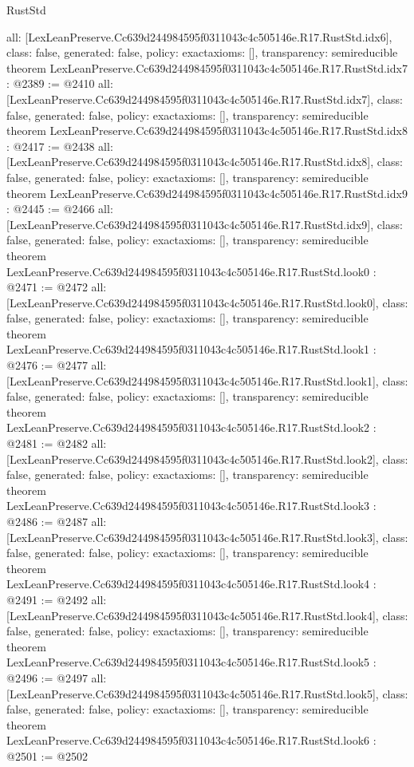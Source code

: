 \begin{lexlean}{RustStd}
\begin{coremodule}
{  all: [LexLeanPreserve.Cc639d244984595f0311043c4c505146e.R17.RustStd.idx6],
  class: false,
  generated: false,
  policy: exact{axioms: []},
  transparency: semireducible
}
theorem LexLeanPreserve.Cc639d244984595f0311043c4c505146e.R17.RustStd.idx7 : @2389 := @2410 {
  all: [LexLeanPreserve.Cc639d244984595f0311043c4c505146e.R17.RustStd.idx7],
  class: false,
  generated: false,
  policy: exact{axioms: []},
  transparency: semireducible
}
theorem LexLeanPreserve.Cc639d244984595f0311043c4c505146e.R17.RustStd.idx8 : @2417 := @2438 {
  all: [LexLeanPreserve.Cc639d244984595f0311043c4c505146e.R17.RustStd.idx8],
  class: false,
  generated: false,
  policy: exact{axioms: []},
  transparency: semireducible
}
theorem LexLeanPreserve.Cc639d244984595f0311043c4c505146e.R17.RustStd.idx9 : @2445 := @2466 {
  all: [LexLeanPreserve.Cc639d244984595f0311043c4c505146e.R17.RustStd.idx9],
  class: false,
  generated: false,
  policy: exact{axioms: []},
  transparency: semireducible
}
theorem LexLeanPreserve.Cc639d244984595f0311043c4c505146e.R17.RustStd.look0 : @2471 := @2472 {
  all: [LexLeanPreserve.Cc639d244984595f0311043c4c505146e.R17.RustStd.look0],
  class: false,
  generated: false,
  policy: exact{axioms: []},
  transparency: semireducible
}
theorem LexLeanPreserve.Cc639d244984595f0311043c4c505146e.R17.RustStd.look1 : @2476 := @2477 {
  all: [LexLeanPreserve.Cc639d244984595f0311043c4c505146e.R17.RustStd.look1],
  class: false,
  generated: false,
  policy: exact{axioms: []},
  transparency: semireducible
}
theorem LexLeanPreserve.Cc639d244984595f0311043c4c505146e.R17.RustStd.look2 : @2481 := @2482 {
  all: [LexLeanPreserve.Cc639d244984595f0311043c4c505146e.R17.RustStd.look2],
  class: false,
  generated: false,
  policy: exact{axioms: []},
  transparency: semireducible
}
theorem LexLeanPreserve.Cc639d244984595f0311043c4c505146e.R17.RustStd.look3 : @2486 := @2487 {
  all: [LexLeanPreserve.Cc639d244984595f0311043c4c505146e.R17.RustStd.look3],
  class: false,
  generated: false,
  policy: exact{axioms: []},
  transparency: semireducible
}
theorem LexLeanPreserve.Cc639d244984595f0311043c4c505146e.R17.RustStd.look4 : @2491 := @2492 {
  all: [LexLeanPreserve.Cc639d244984595f0311043c4c505146e.R17.RustStd.look4],
  class: false,
  generated: false,
  policy: exact{axioms: []},
  transparency: semireducible
}
theorem LexLeanPreserve.Cc639d244984595f0311043c4c505146e.R17.RustStd.look5 : @2496 := @2497 {
  all: [LexLeanPreserve.Cc639d244984595f0311043c4c505146e.R17.RustStd.look5],
  class: false,
  generated: false,
  policy: exact{axioms: []},
  transparency: semireducible
}
theorem LexLeanPreserve.Cc639d244984595f0311043c4c505146e.R17.RustStd.look6 : @2501 := @2502 {
}
\end{coremodule}
\end{lexlean}
